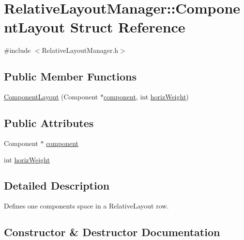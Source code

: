 \hypertarget{structRelativeLayoutManager_1_1ComponentLayout}{}\section{Relative\+Layout\+Manager\+:\+:Component\+Layout Struct Reference}
\label{structRelativeLayoutManager_1_1ComponentLayout}


{\ttfamily \#include $<$Relative\+Layout\+Manager.\+h$>$}

\subsection*{Public Member Functions}
\begin{DoxyCompactItemize}
\item 
\mbox{\hyperlink{structRelativeLayoutManager_1_1ComponentLayout_a9987102795c34955ce217ae0f452c886}{Component\+Layout}} (Component $\ast$\mbox{\hyperlink{structRelativeLayoutManager_1_1ComponentLayout_ae48aa58ac00fdfffea477f053abbbe46}{component}}, int \mbox{\hyperlink{structRelativeLayoutManager_1_1ComponentLayout_ae3e359a01485325959fcac40b0a5bb17}{horiz\+Weight}})
\end{DoxyCompactItemize}
\subsection*{Public Attributes}
\begin{DoxyCompactItemize}
\item 
Component $\ast$ \mbox{\hyperlink{structRelativeLayoutManager_1_1ComponentLayout_ae48aa58ac00fdfffea477f053abbbe46}{component}}
\item 
int \mbox{\hyperlink{structRelativeLayoutManager_1_1ComponentLayout_ae3e359a01485325959fcac40b0a5bb17}{horiz\+Weight}}
\end{DoxyCompactItemize}


\subsection{Detailed Description}
Defines one component\textquotesingle{}s space in a Relative\+Layout row. 

\subsection{Constructor \& Destructor Documentation}
\mbox{\label{structRelativeLayoutManager_1_1ComponentLayout_a9987102795c34955ce217ae0f452c886}} 
